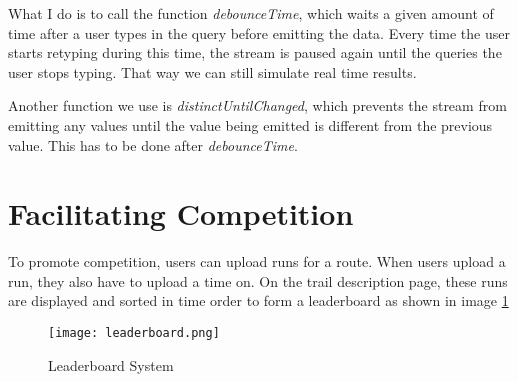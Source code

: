 What I do is to call the function \textit{debounceTime}, which waits a given amount of time after a user types in the query before emitting the data. Every time the user starts retyping during this time, the stream is paused again until the queries the user stops typing. That way we can still simulate real time results.

Another function we use is \textit{distinctUntilChanged}, which prevents the stream from emitting any values until the value being emitted is different from the previous value. This has to be done after \textit{debounceTime}.

\section{Facilitating Competition}
To promote competition, users can upload runs for a route. When users upload a run, they also have to upload a time on. On the trail description page, these runs are displayed and sorted in time order to form a leaderboard as shown in image \ref{fig:leaderboard8}

\begin{figure}[ht]
    \centering
    \texttt{[image: leaderboard.png]}
    \caption{Leaderboard System}
    \label{fig:leaderboard8}
\end{figure}